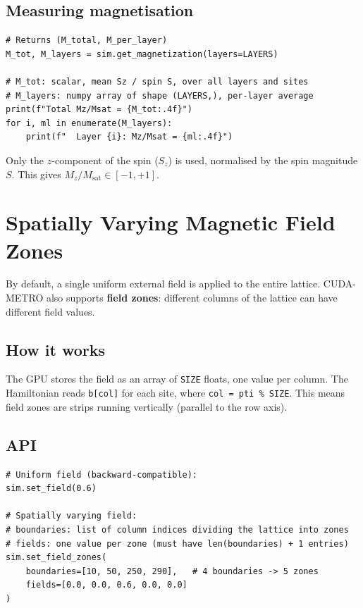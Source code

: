 \documentclass[12pt,a4paper]{article}
\newcommand{\code}[1]{\texttt{#1}}
\newcommand{\param}[1]{\texttt{#1}}
\begin{document}
\subsection{Measuring magnetisation}

\begin{lstlisting}[style=python]
# Returns (M_total, M_per_layer)
M_tot, M_layers = sim.get_magnetization(layers=LAYERS)

# M_tot: scalar, mean Sz / spin S, over all layers and sites
# M_layers: numpy array of shape (LAYERS,), per-layer average
print(f"Total Mz/Msat = {M_tot:.4f}")
for i, ml in enumerate(M_layers):
    print(f"  Layer {i}: Mz/Msat = {ml:.4f}")
\end{lstlisting}

Only the $z$-component of the spin ($S_z$) is used, normalised by the spin
magnitude $S$. This gives $M_z / M_\text{sat} \in [-1, +1]$.

\section{Spatially Varying Magnetic Field Zones}
\label{sec:fieldzones}

By default, a single uniform external field is applied to the entire lattice.
CUDA-METRO also supports \textbf{field zones}: different columns of the
lattice can have different field values.

\subsection{How it works}

The GPU stores the field as an array of \param{SIZE} floats, one value per
column. The Hamiltonian reads \code{b[col]} for each site, where
\code{col = pti \% SIZE}. This means field zones are strips running vertically
(parallel to the row axis).

\subsection{API}

\begin{lstlisting}[style=python]
# Uniform field (backward-compatible):
sim.set_field(0.6)

# Spatially varying field:
# boundaries: list of column indices dividing the lattice into zones
# fields: one value per zone (must have len(boundaries) + 1 entries)
sim.set_field_zones(
    boundaries=[10, 50, 250, 290],   # 4 boundaries -> 5 zones
    fields=[0.0, 0.0, 0.6, 0.0, 0.0]
)
\end{lstlisting}
\end{document}
